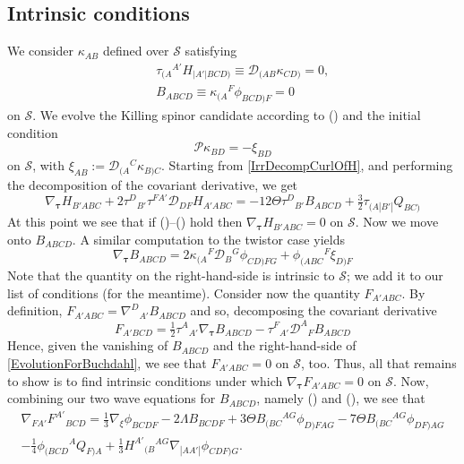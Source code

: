 \documentclass[10pt,a4paper]{article}
\theoremstyle{plain}
\begin{document}
\subsection{Intrinsic conditions}

We consider $\kappa_{AB}$ defined over $\mathcal{S}$ satisfying
\begin{subequations}
\begin{eqnarray}
      && \tau_{(A}{}^{A'}H_{\vert A'\vert BCD)} \equiv  \mathcal{D}_{(AB}\kappa_{CD)}=0,\\
      && B_{ABCD}\equiv \kappa_{(A}{}^F\phi_{BCD)F} = 0
\end{eqnarray}
\end{subequations}
on $\mathcal{S}$. We evolve the Killing spinor candidate according to () and the initial condition
\begin{equation}
     \mathcal{P} \kappa_{BD} = - \xi_{BD}\label{InitialCondition}
\end{equation}
on $\mathcal{S}$, with $\xi_{AB}:=\mathcal{D}_{(A}{}^C\kappa_{B)C}$. Starting from \eqref{IrrDecompCurlOfH}, and performing the decomposition of the covariant derivative, we get
\[ \nabla_{\bm\tau} H_{B'ABC} + 2 \tau^{D}{}_{B'} \tau^{FA'} \mathcal{D}_{DF}H_{A'ABC} = -12 \Theta \tau^{D}{}_{B'}B_{ABCD} + \tfrac{3}{2} \tau_{(A|B'|}Q_{BC)}\]
At this point we see that if ()--() hold then $\nabla_{\bm\tau} H_{B'ABC}=0$ on $\mathcal{S}$. Now we move onto $B_{ABCD}$. A similar computation to the twistor case yields
\begin{equation}
    \nabla_{\bm\tau} B_{ABCD} = 2 \kappa_{(A}{}^{F}\mathcal{D}_{B}{}^{G}\phi_{CD)FG} + \phi_{(ABC}{}^{F}\xi_{D)F}\label{EvolutionForBuchdahl}
\end{equation}
Note that the quantity on the right-hand-side is intrinsic to $\mathcal{S}$; we add it to our list of conditions (for the meantime). Consider now the quantity $F_{A'ABC}$. By definition, $F_{A'ABC}=\nabla^D{}_{A'}B_{ABCD}$ and so, decomposing the covariant derivative
\[F_{A'BCD} = \tfrac{1}{2} \tau^{A}{}_{A'} \nabla_{\bm\tau} B_{ABCD}  -  \tau^{F}{}_{A'} \mathcal{D}^{A}{}_{F}B_{ABCD}\]
Hence, given the vanishing of $B_{ABCD}$ and the right-hand-side of \eqref{EvolutionForBuchdahl}, we see that $F_{A'ABC}=0$ on $\mathcal{S}$, too. Thus, all that remains to show is to find intrinsic conditions under which $\nabla_{\bm\tau}F_{A'ABC}=0$ on $\mathcal{S}$. Now, combining our two wave equations for $B_{ABCD}$, namely () and (), we see that 
\begin{multline}
     \nabla_{FA'}F^{A'}{}_{BCD} = \tfrac{1}{3} \nabla_{\xi}{}\phi_{BCDF} - 2 \Lambda B_{BCDF} + 3\Theta B_{(BC}{}^{AG}  \phi_{D)FAG}  - 7 \Theta B_{(BC}{}^{AG}\phi_{DF)AG} \\-  \tfrac{1}{4} \phi_{(BCD}{}^{A}Q_{F)A} + \tfrac{1}{3} H^{A'}{}_{(B}{}^{AG}\nabla_{|AA'|}\phi_{CDF)G}\label{CurlOfFInTermsOfCollineation}. 
\end{multline}
\end{document}
